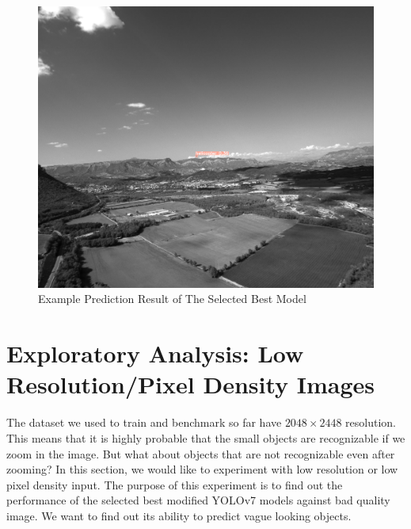 %
\begin{figure}[btp]
  \centering
  \includegraphics[width = .8\linewidth]{figures/best-1.png}
  \caption{Example Prediction Result of The Selected Best Model}
  \label{fig:inference-out}
\end{figure}
\section{Exploratory Analysis: Low Resolution/Pixel Density Images}
The dataset we used to train and benchmark so far have $2048\times 2448$ resolution.
This means that it is highly probable that the small objects are recognizable if we zoom in the image.
But what about objects that are not recognizable even after zooming?
In this section, we would like to experiment with low resolution or low pixel density input.
The purpose of this experiment is to find out the performance of the selected best modified YOLOv7 models against
bad quality image. We want to find out its ability to predict vague looking objects.

